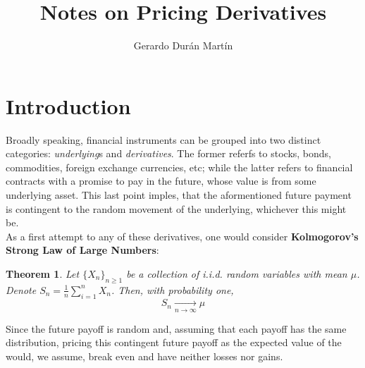 \documentclass{article}
\title{Notes on Pricing Derivatives}
\author{Gerardo Durán Martín}
\newtheorem{theorem}{Theorem}[section]
\begin{document}
\maketitle


\section{Introduction}
Broadly speaking, financial instruments can be grouped into two distinct categories: \textit{underlying}s and \textit{derivatives}. The former referfs to stocks, bonds, commodities, foreign exchange currencies, etc; while the latter refers to financial contracts with a promise to pay in the future, whose value is  from some underlying asset. This last point imples, that the aformentioned future payment is contingent to the random movement of the underlying, whichever this might be.\\

As a first attempt to  any of these derivatives, one would consider \textbf{Kolmogorov's Strong Law of Large Numbers}:

\begin{theorem}
    Let $\{X_n\}_{n\geq 1}$ be a collection of i.i.d. random variables with mean $\mu$. Denote $S_n = \frac{1}{n}\sum_{i=1}^n X_n$. Then, with probability one,
    \begin{equation}
        S_n \xrightarrow[n \rightarrow \infty]{}\mu
    \end{equation}
\end{theorem}

Since the future payoff is random and, assuming that each payoff has the same distribution, pricing this contingent future payoff as the expected value of the would, we assume, break even and have neither losses nor gains. 
\end{document}
